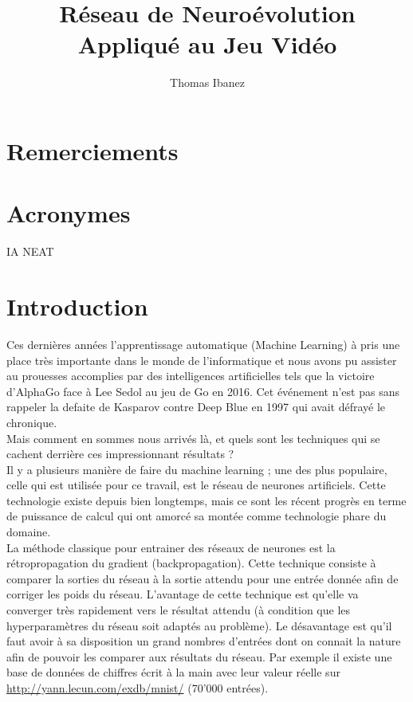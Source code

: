 \documentclass{article}
\title{Réseau de Neuroévolution Appliqué au Jeu Vidéo}
\author{Thomas Ibanez}
\begin{document}
\maketitle
\newpage



\tableofcontents

\newpage

\listoffigures

\newpage

\section*{Remerciements}
\section*{Acronymes}
IA
NEAT


\newpage
\section{Introduction}

Ces dernières années l'apprentissage automatique (Machine Learning) à pris une place très importante dans le monde de l'informatique et nous avons pu assister au prouesses accomplies par des intelligences artificielles tels que la victoire d'AlphaGo face à Lee Sedol au jeu de Go en 2016.\cite{wikialphagolee} Cet événement n'est pas sans rappeler la defaite de Kasparov contre Deep Blue en 1997 qui avait défrayé le chronique.\cite{kasparov}\\
Mais comment en sommes nous arrivés là, et quels sont les techniques qui se cachent derrière ces impressionnant résultats ?\\
Il y a plusieurs manière de faire du machine learning ; une des plus populaire, celle qui est utilisée pour ce travail, est le réseau de neurones artificiels. Cette technologie existe depuis bien longtemps, mais ce sont les récent progrès en terme de puissance de calcul qui ont amorcé sa montée comme technologie phare du domaine.\cite{nnpower}\\

La méthode classique pour entrainer des réseaux de neurones est la rétropropagation du gradient (backpropagation). Cette technique consiste à comparer la sorties du réseau à la sortie attendu pour une entrée donnée afin de corriger les poids du réseau.\cite{backprop} L'avantage de cette technique est qu'elle va converger très rapidement vers le résultat attendu (à condition que les hyperparamètres du réseau soit adaptés au problème). Le désavantage est qu'il faut avoir à sa disposition un grand nombres d'entrées dont on connait la nature afin de pouvoir les comparer aux résultats du réseau. Par exemple il existe une base de données de chiffres écrit à la main avec leur valeur réelle sur \url{http://yann.lecun.com/exdb/mnist/} (70'000 entrées).\\
\end{document}
